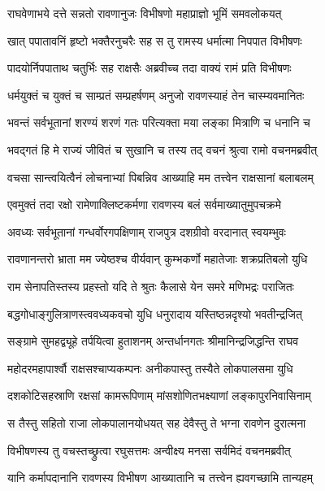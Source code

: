 
\twolineshloka
{राघवेणाभये दत्ते सन्नतो रावणानुजः}
{विभीषणो महाप्राज्ञो भूमिं समवलोकयत्} %

\twolineshloka
{खात् पपातावनिं हृष्टो भक्तैरनुचरैः सह}
{स तु रामस्य धर्मात्मा निपपात विभीषणः} %

\twolineshloka
{पादयोर्निपपाताथ चतुर्भिः सह राक्षसैः}
{अब्रवीच्च तदा वाक्यं रामं प्रति विभीषणः} %

\twolineshloka
{धर्मयुक्तं च युक्तं च साम्प्रतं सम्प्रहर्षणम्}
{अनुजो रावणस्याहं तेन चास्म्यवमानितः} %

\twolineshloka
{भवन्तं सर्वभूतानां शरण्यं शरणं गतः}
{परित्यक्ता मया लङ्का मित्राणि च धनानि च} %

\twolineshloka
{भवद्गतं हि मे राज्यं जीवितं च सुखानि च}
{तस्य तद् वचनं श्रुत्वा रामो वचनमब्रवीत्} %

\twolineshloka
{वचसा सान्त्वयित्वैनं लोचनाभ्यां पिबन्निव}
{आख्याहि मम तत्त्वेन राक्षसानां बलाबलम्} %

\twolineshloka
{एवमुक्तं तदा रक्षो रामेणाक्लिष्टकर्मणा}
{रावणस्य बलं सर्वमाख्यातुमुपचक्रमे} %

\twolineshloka
{अवध्यः सर्वभूतानां गन्धर्वोरगपक्षिणाम्}
{राजपुत्र दशग्रीवो वरदानात् स्वयम्भुवः} %

\twolineshloka
{रावणानन्तरो भ्राता मम ज्येष्ठश्च वीर्यवान्}
{कुम्भकर्णो महातेजाः शक्रप्रतिबलो युधि} %

\twolineshloka
{राम सेनापतिस्तस्य प्रहस्तो यदि ते श्रुतः}
{कैलासे येन समरे मणिभद्रः पराजितः} %

\twolineshloka
{बद्धगोधाङ्गुलित्राणस्त्ववध्यकवचो युधि}
{धनुरादाय यस्तिष्ठन्नदृश्यो भवतीन्द्रजित्} %

\twolineshloka
{सङ्ग्रामे सुमहद्व्यूहे तर्पयित्वा हुताशनम्}
{अन्तर्धानगतः श्रीमानिन्द्रजिद्धन्ति राघव} %

\twolineshloka
{महोदरमहापार्श्वौ राक्षसश्चाप्यकम्पनः}
{अनीकपास्तु तस्यैते लोकपालसमा युधि} %

\twolineshloka
{दशकोटिसहस्राणि रक्षसां कामरूपिणाम्}
{मांसशोणितभक्ष्याणां लङ्कापुरनिवासिनाम्} %

\twolineshloka
{स तैस्तु सहितो राजा लोकपालानयोधयत्}
{सह देवैस्तु ते भग्ना रावणेन दुरात्मना} %

\twolineshloka
{विभीषणस्य तु वचस्तच्छ्रुत्वा रघुसत्तमः}
{अन्वीक्ष्य मनसा सर्वमिदं वचनमब्रवीत्} %

\twolineshloka
{यानि कर्मापदानानि रावणस्य विभीषण}
{आख्यातानि च तत्त्वेन ह्यवगच्छामि तान्यहम्} %

